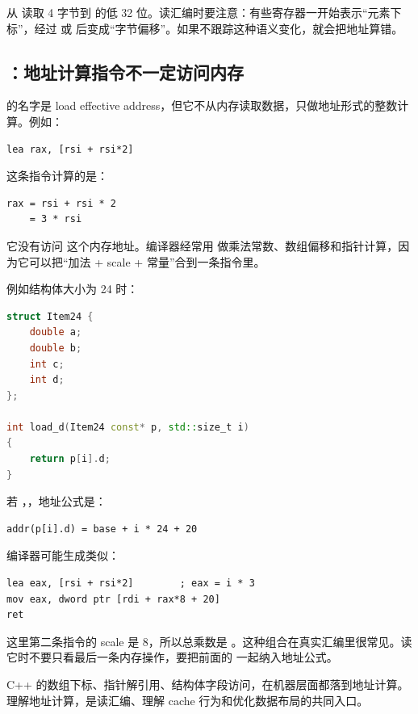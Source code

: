  从  读取 4 字节到  的低 32 位。读汇编时要注意：有些寄存器一开始表示“元素下标”，经过  或  后变成“字节偏移”。如果不跟踪这种语义变化，就会把地址算错。

\subsection{：地址计算指令不一定访问内存}

 的名字是 load effective address，但它不从内存读取数据，只做地址形式的整数计算。例如：

\begin{lstlisting}
lea rax, [rsi + rsi*2]
\end{lstlisting}

这条指令计算的是：

\begin{lstlisting}
rax = rsi + rsi * 2
    = 3 * rsi
\end{lstlisting}

它没有访问  这个内存地址。编译器经常用  做乘法常数、数组偏移和指针计算，因为它可以把“加法 + scale + 常量”合到一条指令里。

例如结构体大小为 24 时：

\begin{lstlisting}[language=C++]
struct Item24 {
    double a;
    double b;
    int c;
    int d;
};

int load_d(Item24 const* p, std::size_t i)
{
    return p[i].d;
}
\end{lstlisting}

若 ，，地址公式是：

\begin{lstlisting}
addr(p[i].d) = base + i * 24 + 20
\end{lstlisting}

编译器可能生成类似：

\begin{lstlisting}
lea eax, [rsi + rsi*2]        ; eax = i * 3
mov eax, dword ptr [rdi + rax*8 + 20]
ret
\end{lstlisting}

这里第二条指令的 scale 是 8，所以总乘数是 。这种组合在真实汇编里很常见。读它时不要只看最后一条内存操作，要把前面的  一起纳入地址公式。

\begin{keyidea}
C++ 的数组下标、指针解引用、结构体字段访问，在机器层面都落到地址计算。理解地址计算，是读汇编、理解 cache 行为和优化数据布局的共同入口。
\end{keyidea}

